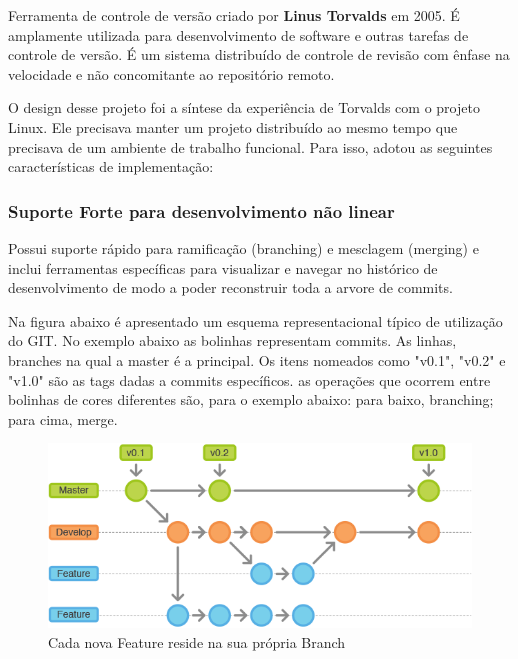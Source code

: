 \documentclass[
	article,			%
	12pt,				%
	oneside,			%
	a4paper,			%
	english,			
	brazil,
	sumario=tradicional
	]{abntex2}
\begin{document}

Ferramenta de controle de versão criado por \textbf{Linus Torvalds} em 2005. É amplamente utilizada para desenvolvimento de software e outras tarefas de controle de versão. É um sistema distribuído de controle de revisão com ênfase na velocidade e não concomitante ao repositório remoto. 

O design desse projeto foi a síntese da experiência de Torvalds com o projeto Linux. Ele precisava manter um projeto distribuído ao mesmo tempo que precisava de um ambiente de trabalho funcional. Para isso, adotou as seguintes características de implementação:

\subsubsection{Suporte Forte para desenvolvimento não linear}
Possui suporte rápido para ramificação (branching) e mesclagem (merging) e inclui ferramentas específicas para visualizar e navegar no histórico de desenvolvimento de modo a poder reconstruir toda a arvore de commits.

Na figura abaixo é apresentado um esquema representacional típico de utilização do GIT. No exemplo abaixo as bolinhas representam commits. As linhas, branches na qual a master é a principal. Os itens nomeados como "v0.1", "v0.2" e "v1.0" são as tags dadas a commits específicos. as operações que ocorrem entre bolinhas de cores diferentes são, para o exemplo abaixo: para baixo, branching; para cima, merge.

\begin{figure}[!h]
\centering
\includegraphics[scale=0.5]{images/git_workflow2.png}
\caption{Cada nova Feature reside na sua própria Branch \cite[Feature Branch]{atlassiangit.1}}
\label{img_git_workflow}
\end{figure}
\end{document}
